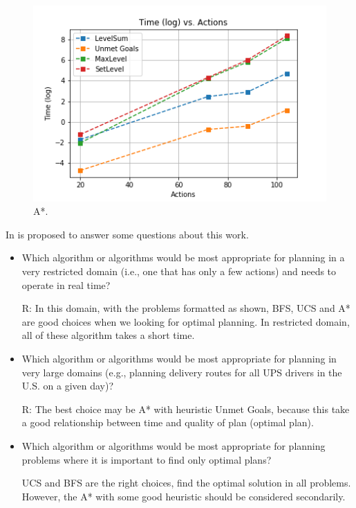 \documentclass[a4paper]{article}
\begin{document}

\begin{figure}[htpb]
\begin{center}
\includegraphics[width=1\columnwidth]{fig/results_031.png}
\end{center}
\caption{A*.}
\label{fig031}
\end{figure}



In \cite{githubUdacityAINDProj2} is proposed to answer some questions about this work. 

\begin{itemize}
    \item Which algorithm or algorithms would be most appropriate for planning in a very restricted domain (i.e., one that has only a few actions) and needs to operate in real time?
    
    R: In this domain, with the problems formatted as shown, BFS, UCS and A* are good choices when we looking for optimal planning. In restricted domain, all of these algorithm takes a short time.
    
    \item Which algorithm or algorithms would be most appropriate for planning in very large domains (e.g., planning delivery routes for all UPS drivers in the U.S. on a given day)?
    
    R: The best choice may be A* with heuristic Unmet Goals, because this take a good relationship between time and quality of plan (optimal plan).
    
    \item Which algorithm or algorithms would be most appropriate for planning problems where it is important to find only optimal plans?
    
    UCS and BFS are the right choices, find the optimal solution in all problems. However, the A* with some good heuristic should be considered secondarily. 
    
\end{itemize}
    
\end{document}

